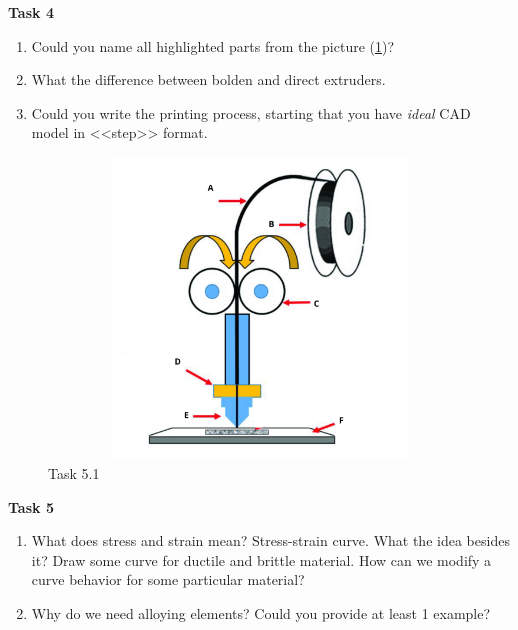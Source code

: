 \documentclass[12pt]{article}
\newcommand\pic[1]{(\cref{#1})} %
\begin{document}
\textbf{Task 4}
\begin{enumerate}
    \item Could you name all highlighted parts from the picture \pic{fig:resources_quiz_1/quiz1_task5.png}?
    \item What the difference between bolden and direct extruders.
    \item Could you write the printing process, starting that you have \textit{ideal} CAD model in <<step>> format.  
\end{enumerate}
\begin{figure}[H]
    \centering\includegraphics[height=8cm,width=1\textwidth,keepaspectratio]{resources_quiz_1/quiz1_task5.png}
    \caption{Task 5.1}
    \label{fig:resources_quiz_1/quiz1_task5.png}
\end{figure}

\textbf{Task 5}
\begin{enumerate}
    \item What does stress and strain mean? Stress-strain curve. What the idea besides it? Draw some curve for ductile and brittle material. How can we modify a curve behavior for some particular material?
    \item Why do we need alloying elements? Could you provide at least 1 example?
\end{enumerate}
\end{document}
